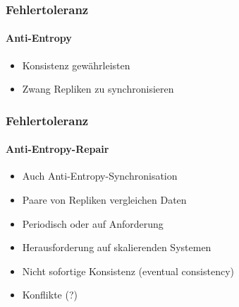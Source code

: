 \begin{frame}
  \frametitle{Fehlertoleranz}
  \framesubtitle{Anti-Entropy}
  \begin{itemize}
    \item Konsistenz gewährleisten
    \item Zwang Repliken zu synchronisieren
  \end{itemize}
\end{frame}

\begin{frame}
  \frametitle{Fehlertoleranz}
  \framesubtitle{Anti-Entropy-Repair}
  \begin{itemize}
    \item Auch Anti-Entropy-Synchronisation
    \item Paare von Repliken vergleichen Daten
    \item Periodisch oder auf Anforderung 
    \item Herausforderung auf skalierenden Systemen
    \item Nicht sofortige Konsistenz (eventual consistency)
    \item Konflikte (?)
  \end{itemize}
\end{frame}